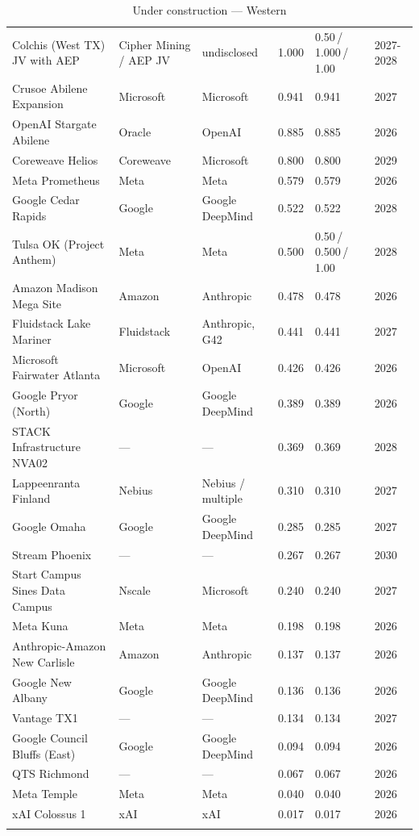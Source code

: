 \documentclass[11pt]{article}
\begin{document}
\begin{small}
\begin{longtable}{@{}p{4.5cm} p{2.6cm} p{2.6cm} R{1.3cm} R{2.4cm} l@{}}
Colchis (West TX) JV with AEP & Cipher Mining / AEP JV & undisclosed & 1.000 & 0.50\,/\,1.000\,/\,1.00 & 2027-2028 \\
Crusoe Abilene Expansion & Microsoft & Microsoft & 0.941 & 0.941 & 2027 \\
OpenAI Stargate Abilene & Oracle & OpenAI & 0.885 & 0.885 & 2026 \\
Coreweave Helios & Coreweave & Microsoft & 0.800 & 0.800 & 2029 \\
Meta Prometheus & Meta & Meta & 0.579 & 0.579 & 2026 \\
Google Cedar Rapids & Google & Google DeepMind & 0.522 & 0.522 & 2028 \\
Tulsa OK (Project Anthem) & Meta & Meta & 0.500 & 0.50\,/\,0.500\,/\,1.00 & 2028 \\
Amazon Madison Mega Site & Amazon & Anthropic & 0.478 & 0.478 & 2026 \\
Fluidstack Lake Mariner & Fluidstack & Anthropic, G42 & 0.441 & 0.441 & 2027 \\
Microsoft Fairwater Atlanta & Microsoft & OpenAI & 0.426 & 0.426 & 2026 \\
Google Pryor (North) & Google & Google DeepMind & 0.389 & 0.389 & 2026 \\
STACK Infrastructure NVA02 & — & — & 0.369 & 0.369 & 2028 \\
Lappeenranta Finland & Nebius & Nebius / multiple & 0.310 & 0.310 & 2027 \\
Google Omaha & Google & Google DeepMind & 0.285 & 0.285 & 2027 \\
Stream Phoenix & — & — & 0.267 & 0.267 & 2030 \\
Start Campus Sines Data Campus & Nscale & Microsoft & 0.240 & 0.240 & 2027 \\
Meta Kuna & Meta & Meta & 0.198 & 0.198 & 2026 \\
Anthropic-Amazon New Carlisle & Amazon & Anthropic & 0.137 & 0.137 & 2026 \\
Google New Albany & Google & Google DeepMind & 0.136 & 0.136 & 2026 \\
Vantage TX1 & — & — & 0.134 & 0.134 & 2027 \\
Google Council Bluffs (East) & Google & Google DeepMind & 0.094 & 0.094 & 2026 \\
QTS Richmond & — & — & 0.067 & 0.067 & 2026 \\
Meta Temple & Meta & Meta & 0.040 & 0.040 & 2026 \\
xAI Colossus 1 & xAI & xAI & 0.017 & 0.017 & 2026 \\
\caption{Under construction --- Western}\label{tab:uc-w}
\end{longtable}
\end{small}
\end{document}
